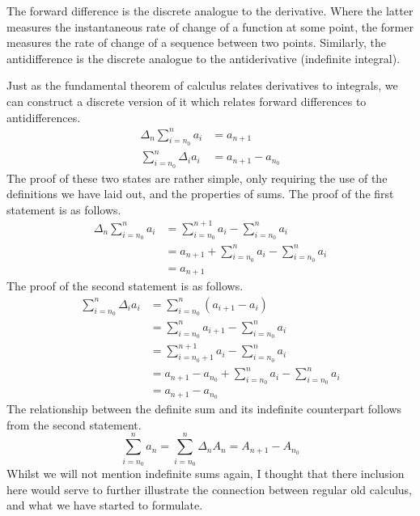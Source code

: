 \documentclass[12pt]{article}
\theoremstyle{definition}
\begin{document}
The forward difference is the discrete analogue to the derivative.
Where the latter measures the instantaneous rate of change of a function at some point, the former measures the rate of change of a sequence between two points.
Similarly, the antidifference is the discrete analogue to the antiderivative (indefinite integral).

Just as the fundamental theorem of calculus relates derivatives to integrals, we can construct a discrete version of it which relates forward differences to antidifferences.
\begin{align}
    \Delta_n \sum_{i=n_0}^{n} a_i & = a_{n+1}           \\
    \sum_{i=n_0}^n \Delta_i a_i   & = a_{n+1} - a_{n_0}
\end{align}
The proof of these two states are rather simple, only requiring the use of the definitions we have laid out, and the properties of sums.
The proof of the first statement is as follows.
\begin{align*}
    \Delta_n \sum_{i=n_0}^{n} a_i & = \sum_{i=n_0}^{n+1} a_i - \sum_{i=n_0}^{n} a_i         \\
                                  & = a_{n+1} + \sum_{i=n_0}^{n} a_i - \sum_{i=n_0}^{n} a_i \\
                                  & = a_{n+1}
\end{align*}
The proof of the second statement is as follows.
\begin{align*}
    \sum_{i=n_0}^n \Delta_i a_i & = \sum_{i=n_0}^n (a_{i+1} - a_i)                                \\
                                & = \sum_{i=n_0}^n a_{i+1} - \sum_{i=n_0}^n a_i                   \\
                                & = \sum_{i=n_0+1}^{n+1} a_i - \sum_{i=n_0}^n a_i                 \\
                                & = a_{n+1} - a_{n_0} + \sum_{i=n_0}^{n} a_i - \sum_{i=n_0}^n a_i \\
                                & = a_{n+1} - a_{n_0}
\end{align*}
The relationship between the definite sum and its indefinite counterpart follows from the second statement.
\begin{equation}
    \sum_{i=n_0}^n a_n = \sum_{i=n_0}^n \Delta_n A_n = A_{n+1} - A_{n_0}
\end{equation}
Whilst we will not mention indefinite sums again, I thought that there inclusion here would serve to further illustrate the connection between regular old calculus, and what we have started to formulate.
\end{document}
